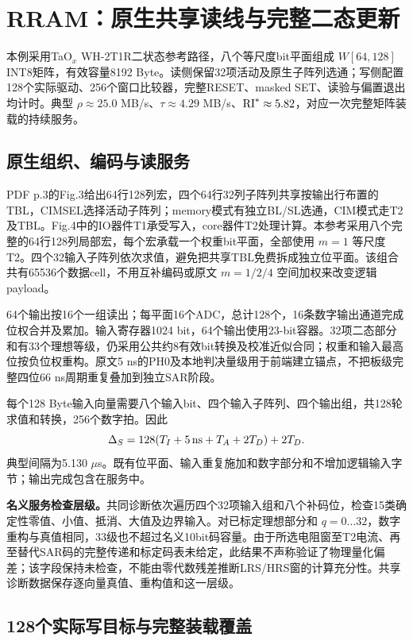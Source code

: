 \section{RRAM：原生共享读线与完整二态更新}

本例采用TaO$_x$ WH-2T1R二状态参考路径，八个等尺度bit平面组成 $W[64,128]$ INT8矩阵，有效容量8192 Byte。读侧保留32项活动及原生子阵列选通；写侧配置128个实际驱动、256个窗口比较器，完整RESET、masked SET、读验与偏置退出均计时。典型 $\rho\approx25.0$ MB/s、$\tau\approx4.29$ MB/s、$\mathrm{RI}^*\approx5.82$，对应一次完整矩阵装载的持续服务。

\subsection{原生组织、编码与读服务}

 PDF p.3的Fig.3给出64行128列宏，四个64行32列子阵列共享按输出行布置的TBL，CIMSEL选择活动子阵列；memory模式有独立BL/SL选通，CIM模式走T2及TBL。Fig.4中的IO器件T1承受写入，core器件T2处理计算。本参考采用八个完整的64行128列局部宏，每个宏承载一个权重bit平面，全部使用 $m=1$ 等尺度T2。四个32输入子阵列依次求值，避免把共享TBL免费拆成独立位平面。该组合共有65536个数据cell，不用互补编码或原文 $m=1/2/4$ 空间加权来改变逻辑payload。

64个输出按16个一组读出；每平面16个ADC，总计128个，16条数字输出通道完成位权合并及累加。输入寄存器1024 bit，64个输出使用23-bit容器。32项二态部分和有33个理想等级，仍采用公共约8有效bit转换及校准近似合同；权重和输入最高位按负位权重构。原文5 ns的PH0及本地判决量级用于前端建立锚点，不把板级完整四位66 ns周期重复叠加到独立SAR阶段。

每个128 Byte输入向量需要八个输入bit、四个输入子阵列、四个输出组，共128轮求值和转换，256个数字拍。因此
\begin{equation}
\Delta_S=128(T_I+5\,\mathrm{ns}+T_A+2T_D)+2T_D.
\label{05_rram:eq:read}
\end{equation}
典型间隔为5.130 $\mu$s。既有位平面、输入重复施加和数字部分和不增加逻辑输入字节；输出完成包含在服务中。

\textbf{名义服务检查层级。}共同诊断依次遍历四个32项输入组和八个补码位，检查15类确定性零值、小值、抵消、大值及边界输入。对已标定理想部分和 $q=0\ldots32$，数字重构与真值相同，33级也不超过名义10bit码容量。由于所选电阻窗至T2电流、再至替代SAR码的完整传递和标定码表未给定，此结果不声称验证了物理量化偏差；该字段保持未检查，不能由零代数残差推断LRS/HRS窗的计算充分性。共享诊断数据保存逐向量真值、重构值和这一层级。

\subsection{128个实际写目标与完整装载覆盖}

